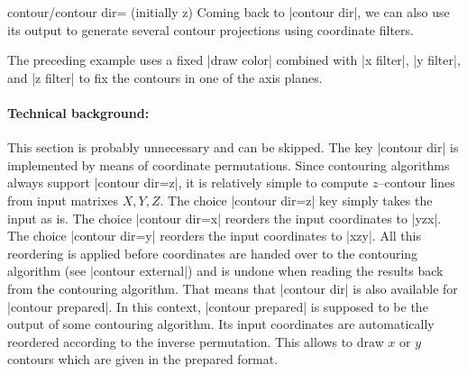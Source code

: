 {{\begin{pgfplotskey}{contour/contour dir= (initially z)}
    Coming back to |contour dir|, we can also use its output to generate
    several contour projections using coordinate filters.
\pgfplotsexpensiveexample
\begin{codeexample}[]
\end{codeexample}
    \noindent The preceding example uses a fixed |draw color| combined with
    |x filter|, |y filter|, and |z filter| to fix the contours in one of the
    axis planes.


    \paragraph{Technical background:}

    This section is probably unnecessary and can be skipped. The key
    |contour dir| is implemented by means of coordinate permutations. Since
    contouring algorithms always support |contour dir=z|, it is relatively
    simple to compute $z$--contour lines from input matrixes $X, Y, Z$. The
    choice |contour dir=z| key simply takes the input as is. The choice
    |contour dir=x| reorders the input coordinates to |yzx|. The choice
    |contour dir=y| reorders the input coordinates to |xzy|. All this
    reordering is applied before coordinates are handed over to the contouring
    algorithm (see |contour external|) and is undone when reading the results
    back from the contouring algorithm. That means that |contour dir| is also
    available for |contour prepared|. In this context, |contour prepared| is
    supposed to be the output of some contouring algorithm. Its input
    coordinates are automatically reordered according to the inverse
    permutation. This allows to draw $x$ or $y$ contours which are given in the
    prepared format.
\end{pgfplotskey}

}}
